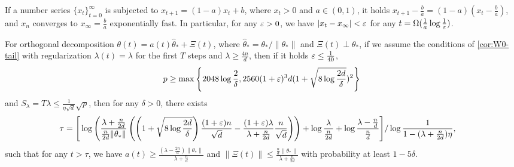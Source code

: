 \begin{lemma}\label{lem:series}
    If a number series $\{x_t\}_{t=0}^\infty$ is subjected to $x_{t+1} = (1-a)x_t + b$, where $x_t > 0$ and $a\in(0,1)$, it holds $x_{t+1} - \frac{b}{a} = (1-a) (x_t - \frac{b}{a})$, and $x_n$ converges to $x_\infty = \frac{b}{a}$ exponentially fast. In particular, for any $\varepsilon >0$, we have $|x_t-x_\infty|<\varepsilon$ for any $t = \Omega(\frac{1}{a}\log\frac{1}{\varepsilon})$.
\end{lemma}

\begin{lemma}\label{lem:series-bound}
   For orthogonal decomposition $\theta(t) = a(t) \hat\theta_\ast + \Xi(t)$, where $\hat\theta_\ast = \theta_\ast/\|\theta_\ast\|$ and $\Xi(t) \perp \theta_\ast$, if we assume the conditions of \cref{cor:W0-tail} with regularization $\lambda(t) = \lambda$ for the first $T$ steps and $\lambda \geq \frac{4n}{d}$, then if it holds $\varepsilon\leq \frac{1}{40}$,
   \begin{align*}
       p\geq \max\left\{2048\log\frac{2}{\delta},2560(1+\varepsilon)^3d(1+\sqrt{8\log\frac{2d}{\delta}})^2\right\}
   \end{align*}
   and $S_\lambda = T\lambda\leq \frac{1}{\eta\sqrt{d}}\sqrt{p}$, then for any $\delta>0$, there exists
   \begin{align*}
       \tau & = \Bigg[\log\left(\frac{\lambda+\frac{n}{2d}}{\frac{n}{2d}\|\theta_*\|} \left(\left(1 + \sqrt{8\log\frac{2d}{\delta}}\right)\frac{(1+\varepsilon)n}{\sqrt{d}} - \frac{(1+\varepsilon)\lambda}{\lambda + \frac{n}{2d}}\frac{n}{\sqrt{d}}\right)\right) + \log\frac{\lambda}{\frac{n}{2d}} + \log\frac{\lambda-\frac{n}{d}}{\frac{n}{d}}\Bigg]/\log\frac{1}{1 - (\lambda+\frac{n}{2d})\eta},
   \end{align*}
   such that for any $t>\tau$, we have $a(t)\geq \frac{(\lambda - \frac{2n}{d})\|\theta_*\|}{\lambda + \frac{n}{d}}$ and $\|\Xi(t)\|\leq \frac{\frac{n}{d}\|\theta_*\|}{\lambda + \frac{n}{2d}}$ with probability at least $1-5\delta$.
\end{lemma}

